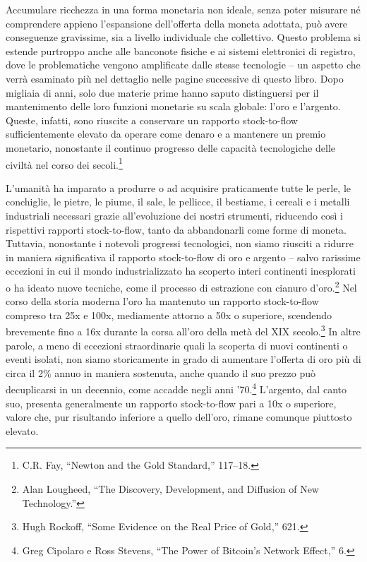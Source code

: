 \documentclass[
  a5paper,
  smalldemyvopaper,10pt,twoside,onecolumn,openright,extrafontsizes,hidelinks]{memoir}
\begin{document}
Accumulare ricchezza in una forma monetaria non ideale, senza poter
misurare né comprendere appieno l'espansione dell'offerta della moneta
adottata, può avere conseguenze gravissime, sia a livello individuale
che collettivo. Questo problema si estende purtroppo anche alle
banconote fisiche e ai sistemi elettronici di registro, dove le
problematiche vengono amplificate dalle stesse tecnologie -- un aspetto
che verrà esaminato più nel dettaglio nelle pagine successive di questo
libro. Dopo migliaia di anni, solo due materie prime hanno saputo
distinguersi per il mantenimento delle loro funzioni monetarie su scala
globale: l'oro e l'argento. Queste, infatti, sono riuscite a conservare
un rapporto stock-to-flow sufficientemente elevato da operare come
denaro e a mantenere un premio monetario, nonostante il continuo
progresso delle capacità tecnologiche delle civiltà nel corso dei
secoli.\footnote{C.R. Fay, ``Newton and the Gold Standard,'' 117--18.}

L'umanità ha imparato a produrre o ad acquisire praticamente tutte le
perle, le conchiglie, le pietre, le piume, il sale, le pellicce, il
bestiame, i cereali e i metalli industriali necessari grazie
all'evoluzione dei nostri strumenti, riducendo così i rispettivi
rapporti stock-to-flow, tanto da abbandonarli come forme di moneta.
Tuttavia, nonostante i notevoli progressi tecnologici, non siamo
riusciti a ridurre in maniera significativa il rapporto stock-to-flow di
oro e argento -- salvo rarissime eccezioni in cui il mondo
industrializzato ha scoperto interi continenti inesplorati o ha ideato
nuove tecniche, come il processo di estrazione con cianuro
d'oro.\footnote{Alan Lougheed, ``The Discovery, Development, and
  Diffusion of New Technology.''} Nel corso della storia moderna l'oro
ha mantenuto un rapporto stock-to-flow compreso tra 25x e 100x,
mediamente attorno a 50x o superiore, scendendo brevemente fino a 16x
durante la corsa all'oro della metà del XIX secolo.\footnote{Hugh
  Rockoff, ``Some Evidence on the Real Price of Gold,'' 621.} In altre
parole, a meno di eccezioni straordinarie quali la scoperta di nuovi
continenti o eventi isolati, non siamo storicamente in grado di
aumentare l'offerta di oro più di circa il 2\% annuo in maniera
sostenuta, anche quando il suo prezzo può decuplicarsi in un decennio,
come accadde negli anni '70.\footnote{Greg Cipolaro e Ross Stevens,
  ``The Power of Bitcoin's Network Effect,'' 6.} L'argento, dal canto
suo, presenta generalmente un rapporto stock-to-flow pari a 10x o
superiore, valore che, pur risultando inferiore a quello dell'oro,
rimane comunque piuttosto elevato.
\end{document}
